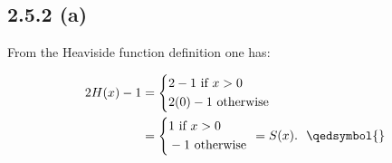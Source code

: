 \documentclass{exam}
\begin{document}
\subsection*{2.5.2 (a)}
From the Heaviside function definition one has: 

\begin{equation*}
    \begin{aligned}
        2H(x) -1 &= 
        \left\{
        \begin{aligned}
            &2 - 1 \text{ if } x > 0 \\
            &2(0)-1 \text{ otherwise}
        \end{aligned}
        \right. \\
        &= \left\{
            \begin{aligned}
                &1 \text{ if } x > 0 \\
                &-1 \text{ otherwise}
            \end{aligned}
        \right. \ 
        = S(x). \text{ \ \qedsymbol{}}
    \end{aligned}    
\end{equation*}
\end{document}
